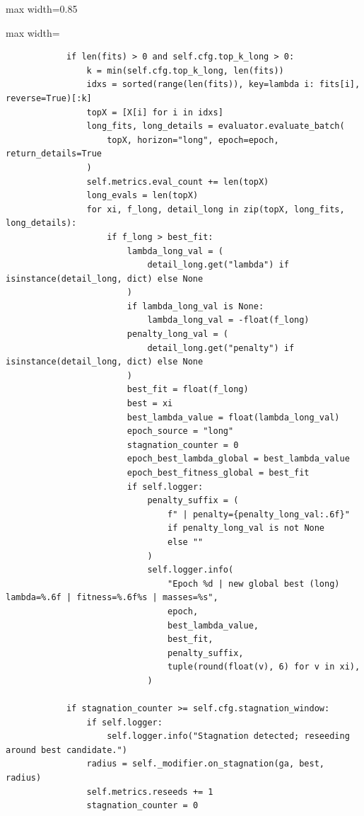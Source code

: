 \begin{listing}[H]
\begin{adjustbox}{max width=0.85\textwidth}
\begin{minipage}{\linewidth}
{\begin{adjustbox}{max width=\textwidth}
\begin{minipage}{\textwidth}
\begin{verbatim}
            if len(fits) > 0 and self.cfg.top_k_long > 0:
                k = min(self.cfg.top_k_long, len(fits))
                idxs = sorted(range(len(fits)), key=lambda i: fits[i], reverse=True)[:k]
                topX = [X[i] for i in idxs]
                long_fits, long_details = evaluator.evaluate_batch(
                    topX, horizon="long", epoch=epoch, return_details=True
                )
                self.metrics.eval_count += len(topX)
                long_evals = len(topX)
                for xi, f_long, detail_long in zip(topX, long_fits, long_details):
                    if f_long > best_fit:
                        lambda_long_val = (
                            detail_long.get("lambda") if isinstance(detail_long, dict) else None
                        )
                        if lambda_long_val is None:
                            lambda_long_val = -float(f_long)
                        penalty_long_val = (
                            detail_long.get("penalty") if isinstance(detail_long, dict) else None
                        )
                        best_fit = float(f_long)
                        best = xi
                        best_lambda_value = float(lambda_long_val)
                        epoch_source = "long"
                        stagnation_counter = 0
                        epoch_best_lambda_global = best_lambda_value
                        epoch_best_fitness_global = best_fit
                        if self.logger:
                            penalty_suffix = (
                                f" | penalty={penalty_long_val:.6f}"
                                if penalty_long_val is not None
                                else ""
                            )
                            self.logger.info(
                                "Epoch %d | new global best (long) lambda=%.6f | fitness=%.6f%s | masses=%s",
                                epoch,
                                best_lambda_value,
                                best_fit,
                                penalty_suffix,
                                tuple(round(float(v), 6) for v in xi),
                            )

            if stagnation_counter >= self.cfg.stagnation_window:
                if self.logger:
                    self.logger.info("Stagnation detected; reseeding around best candidate.")
                radius = self._modifier.on_stagnation(ga, best, radius)
                self.metrics.reseeds += 1
                stagnation_counter = 0


\end{verbatim}
\end{minipage}
\end{adjustbox}}
\end{minipage}
\end{adjustbox}
\end{listing}

